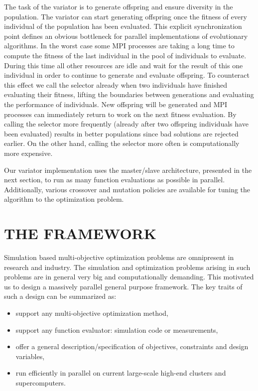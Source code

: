 \documentclass[%
reprint,
amsmath,amssymb,
aps,
prstab,
]{revtex4-1}
\begin{document}
The task of the variator is to generate offspring and ensure diversity in the
  population.
The variator can start generating offspring once the fitness of every
  individual of the population has been evaluated.
This explicit synchronization point defines an obvious bottleneck for parallel
  implementations of evolutionary algorithms.
In the worst case some MPI processes are taking a long time to compute the
  fitness of the last individual in the pool of individuals to evaluate.
During this time all other resources are idle and wait for the result of
  this one individual in order to continue to generate and evaluate offspring.
To counteract this effect we call the selector already when two individuals
  have finished evaluating their fitness, lifting the boundaries between
  generations and evaluating the performance of individuals.
New offspring will be generated and MPI processes can immediately return to
  work on the next fitness evaluation.
By calling the selector more frequently (already after two offspring
  individuals have been evaluated) results in better populations since bad
  solutions are rejected earlier.
On the other hand, calling the selector more often is computationally more
  expensive.

Our variator implementation uses the master/slave architecture, presented in
  the next section, to run as many function evaluations as possible in parallel.
Additionally, various crossover and mutation policies are available for tuning
  the algorithm to the optimization problem.



\section{THE FRAMEWORK} \label{sec:framework}

Simulation based multi-objective optimization problems are omnipresent in
  research and industry.
The simulation and optimization problems arising in such problems are in
  general very big and computationally demanding.
This motivated us to design a massively parallel general purpose framework.
The key traits of such a design can be summarized as:
%
\begin{itemize}
  \item support any multi-objective optimization method,
  \item support any function evaluator: simulation code or measurements,
  \item offer a general description/specification of objectives, constraints
        and design variables,
  \item run efficiently in parallel on current large-scale high-end clusters
        and supercomputers.
\end{itemize}
%
\end{document}
